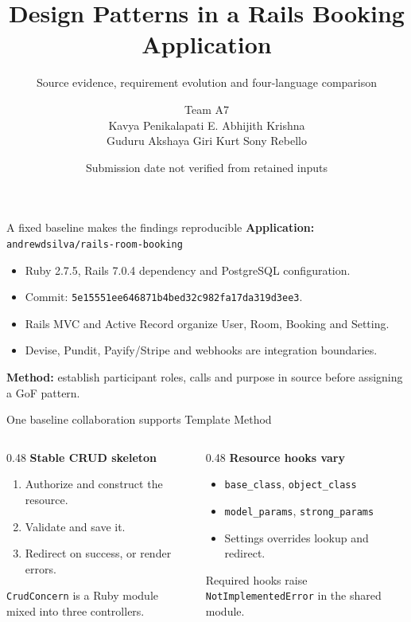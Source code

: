 \documentclass[aspectratio=169,11pt]{beamer}
\title{Design Patterns in a Rails Booking Application}
\subtitle{Source evidence, requirement evolution and four-language comparison}
\author{Team A7\\\small Kavya Penikalapati \quad E. Abhijith Krishna\\\small Guduru Akshaya Giri \quad Kurt Sony Rebello}
\institute{23CSE455 -- B.Tech Artificial Intelligence \& Data Science}
\date{Submission date not verified from retained inputs}
\begin{document}
\begin{frame}\titlepage\end{frame}
\begin{frame}{A fixed baseline makes the findings reproducible}
\textbf{Application:} \texttt{andrewdsilva/rails-room-booking}
\begin{itemize}
\item Ruby 2.7.5, Rails 7.0.4 dependency and PostgreSQL configuration.
\item Commit: {\scriptsize\texttt{5e15551ee646871b4bed32c982fa17da319d3ee3}}.
\item Rails MVC and Active Record organize User, Room, Booking and Setting.
\item Devise, Pundit, Payify/Stripe and webhooks are integration boundaries.
\end{itemize}
\vspace{0.3cm}
\textbf{Method:} establish participant roles, calls and purpose in source before assigning a GoF pattern.
\end{frame}
\begin{frame}{One baseline collaboration supports Template Method}
\begin{columns}[T]
\begin{column}{0.48\textwidth}
\textbf{Stable CRUD skeleton}
\begin{enumerate}
\item Authorize and construct the resource.
\item Validate and save it.
\item Redirect on success, or render errors.
\end{enumerate}
\texttt{CrudConcern} is a Ruby module mixed into three controllers.
\end{column}
\begin{column}{0.48\textwidth}
\textbf{Resource hooks vary}
\begin{itemize}
\item \texttt{base\_class}, \texttt{object\_class}
\item \texttt{model\_params}, \texttt{strong\_params}
\item Settings overrides lookup and redirect.
\end{itemize}
Required hooks raise \texttt{NotImplementedError} in the shared module.
\end{column}
\end{columns}
\end{frame}
\end{document}
